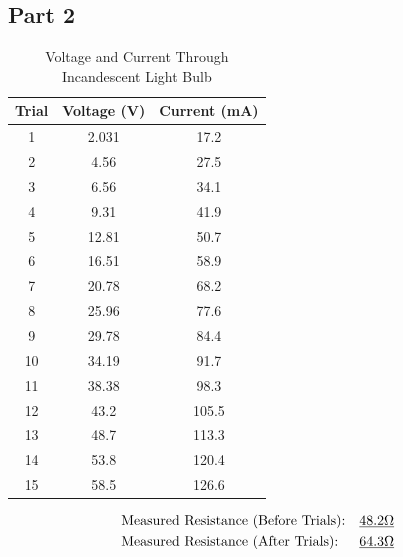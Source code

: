 \documentclass[twocolumn,english]{IEEEtran}
\theoremstyle{plain}
\theoremstyle{plain}
\begin{document}
\subsection*{\textbf{Part 2}}
  \begin{table}[H]
  \caption{Voltage and Current Through Incandescent Light Bulb}
  \centering{}
  \label{tb:data_part2}
  \begin{tabular}{|c|c|c|}
  \hline
  \textbf{Trial} & \textbf{Voltage (V)} & \textbf{Current (mA)} \\ \hline
  1              & 2.031                & 17.2                  \\ \hline
  2              & 4.56                 & 27.5                  \\ \hline
  3              & 6.56                 & 34.1                  \\ \hline
  4              & 9.31                 & 41.9                  \\ \hline
  5              & 12.81                & 50.7                  \\ \hline
  6              & 16.51                & 58.9                  \\ \hline
  7              & 20.78                & 68.2                  \\ \hline
  8              & 25.96                & 77.6                  \\ \hline
  9              & 29.78                & 84.4                  \\ \hline
  10             & 34.19                & 91.7                  \\ \hline
  11             & 38.38                & 98.3                  \\ \hline
  12             & 43.2                 & 105.5                 \\ \hline
  13             & 48.7                 & 113.3                 \\ \hline
  14             & 53.8                 & 120.4                 \\ \hline
  15             & 58.5                 & 126.6                 \\ \hline
  \end{tabular}
  \end{table}
  \begin{align*}
  &\text{Measured Resistance (Before Trials):} 		&\text{\underline{48.2$\Omega$} } 	\\
  &\text{Measured Resistance (After Trials):} 		&\text{\underline{64.3$\Omega$} }	\\
  \end{align*}
\end{document}
